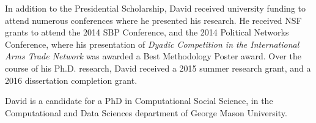 \documentclass[11 pt]{report}
\begin{document}
In addition to the Presidential Scholarship, David received university funding to attend numerous conferences where he presented his research. He received NSF grants to attend the 2014 SBP Conference, and the 2014 Political Networks Conference, where his presentation of \emph{Dyadic Competition in the International Arms Trade Network} was awarded a Best Methodology Poster award. Over the course of his Ph.D. research, David received a 2015 summer research grant, and a 2016 dissertation completion grant.

David is a candidate for a PhD in Computational Social Science, in the Computational and Data Sciences department of George Mason University.
\end{document}

